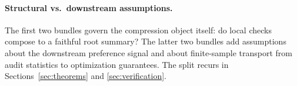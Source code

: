 \paragraph{Structural vs.\ downstream assumptions.}
The first two bundles govern the compression object itself: do local checks compose to a faithful root summary? The latter two bundles add assumptions about the downstream preference signal and about finite-sample transport from audit statistics to optimization guarantees. The split recurs in Sections~\ref{sec:theorems} and \ref{sec:verification}.
